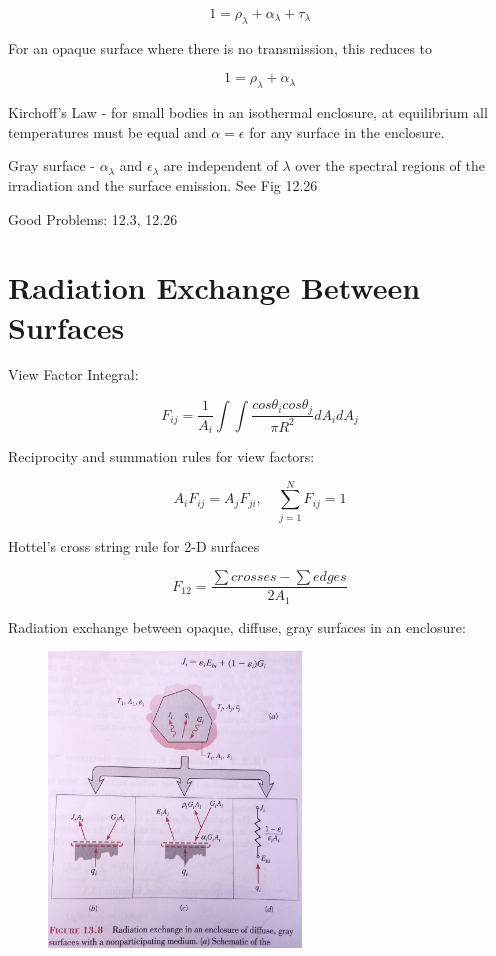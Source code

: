 \documentclass[paper=letter, fontsize=11pt]{scrartcl}
\numberwithin{equation}{section}        %
\numberwithin{figure}{section}          %
\numberwithin{table}{section}               %
\begin{document}
\begin{equation}
1 = \rho_\lambda + \alpha_\lambda + \tau_\lambda
\end{equation}

For an opaque surface where there is no transmission, this reduces to

\begin{equation}
1 = \rho_\lambda + \alpha_\lambda
\end{equation}

Kirchoff’s Law - for small bodies in an isothermal enclosure, at equilibrium all temperatures must be equal and $\alpha=\epsilon$ for any surface in the enclosure.

Gray surface - $\alpha_\lambda$ and $\epsilon_\lambda$ are independent of $\lambda$ over the spectral regions of the irradiation and the surface emission. See Fig 12.26

\bigskip Good Problems: 12.3, 12.26


\section{Radiation Exchange Between Surfaces}

View Factor Integral:

\begin{equation}
F_{ij} = \frac{1}{A_i}\int\int\frac{cos\theta_icos\theta_j}{\pi R^2}dA_idA_j
\end{equation}

Reciprocity and summation rules for view factors:

\begin{equation}
A_i F_{ij} = A_j F_{ji},\quad \sum_{j=1}^N F_{ij} = 1
\end{equation}

Hottel’s cross string rule for 2-D surfaces

\begin{equation}
F_{12} = \frac{\sum crosses-\sum edges}{2A_1}
\end{equation}

Radiation exchange between opaque, diffuse, gray surfaces in an enclosure:

\begin{figure}[!ht]
\centering
\includegraphics[width=0.6\textwidth]{./Figures/radiation_surface}
\end{figure}
\end{document}
